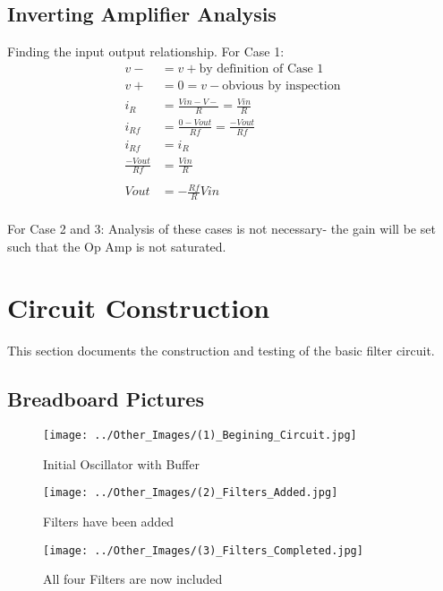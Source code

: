 \documentclass[11pt]{article} %
\begin{document}
\subsection{Inverting Amplifier Analysis}
Finding the input output relationship.
For Case 1:
\begin{align} %
v- &= v+ \text{by definition of Case 1}\\
v+ &= 0 = v- \text{obvious by inspection}\\
i_{R} &= \frac{Vin - V-}{R} = \frac{Vin}{R}\\
i_{Rf} &= \frac{0 - Vout}{Rf} = \frac{-Vout}{Rf}\\
i_{Rf} &= i_{R}\\
\frac{-Vout}{Rf} &= \frac{Vin}{R}\\
\\
Vout &= -\frac{Rf}{R}Vin\\
\end{align}

For Case 2 and 3: Analysis of these cases is not necessary- the gain will be set such that the Op Amp is not saturated.


\section{Circuit Construction}
This section documents the construction and testing of the basic filter circuit.

\subsection{Breadboard Pictures}
\begin{figure} [H]
	\centering
	\texttt{[image: ../Other\_Images/(1)\_Begining\_Circuit.jpg]}
	\caption {Initial Oscillator with Buffer} %
	\label{fig:First_Breadboard_Picture} %
\end{figure}

\begin{figure} [H]
	\centering
	\texttt{[image: ../Other\_Images/(2)\_Filters\_Added.jpg]}
	\caption {Filters have been added} %
	\label{fig:Filters_Added_Breadboard_Picture} %
\end{figure}

\begin{figure} [H]
	\centering
	\texttt{[image: ../Other\_Images/(3)\_Filters\_Completed.jpg]}
	\caption {All four Filters are now included} %
	\label{fig:Filters_Completed_Breadboard_Picture} %
\end{figure}
\end{document}
